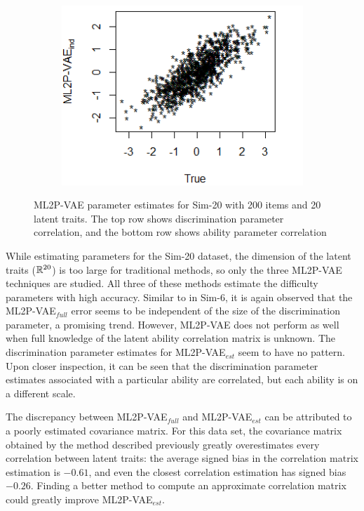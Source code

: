 \begin{figure}[h]
\begin{subfigure}{.32\textwidth}
    \end{subfigure}
    \begin{subfigure}{.32\textwidth}
      \centering
      \includegraphics[width=.9\linewidth]{img/ml_journal_results/20skills/vae_ind_theta_20skills.png}
    \end{subfigure}
    \caption{ML2P-VAE parameter estimates for Sim-20 with 200 items and 20 latent traits. The top row shows discrimination parameter correlation, and the bottom row shows ability parameter correlation}
    \label{fig:20skill_cor}
\end{figure}

While estimating parameters for the Sim-20 dataset, the dimension of the latent traits ($\mathbb{R}^{20}$) is too large for traditional methods, so only the three ML2P-VAE techniques are studied. All three of these methods estimate the difficulty parameters with high accuracy. Similar to in Sim-6, it is again observed that the ML2P-VAE$_{full}$ error seems to be independent of the size of the discrimination parameter, a promising trend. However, ML2P-VAE does not perform as well when full knowledge of the latent ability correlation matrix is unknown. The discrimination parameter estimates for ML2P-VAE$_{est}$ seem to have no pattern. Upon closer inspection, it can be seen that the discrimination parameter estimates associated with a particular ability are correlated, but each ability is on a different scale. 

The discrepancy between ML2P-VAE$_{full}$ and ML2P-VAE$_{est}$ can be attributed to a poorly estimated covariance matrix. For this data set, the covariance matrix obtained by the method described previously greatly overestimates every correlation between latent traits: the average signed bias in the correlation matrix estimation is $-0.61$, and even the closest correlation estimation has signed bias $-0.26$. Finding a better method to compute an approximate correlation matrix could greatly improve ML2P-VAE$_{est}$.

